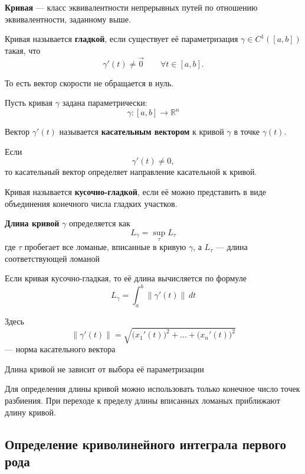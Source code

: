 \documentclass[12pt,a4paper]{article}
\begin{document}
\begin{definition}
\textbf{Кривая} — класс эквивалентности непрерывных путей по отношению эквивалентности, заданному выше.
\end{definition}

\begin{definition}
Кривая называется \textbf{гладкой}, если существует её параметризация
$\gamma \in C^1([a,b])$ такая, что
\[
\gamma'(t)\neq \vec{0}
\qquad \forall t\in[a,b].
\]

То есть вектор скорости не обращается в нуль.
\end{definition}

Пусть кривая $\gamma$ задана параметрически:
\[
\gamma:[a,b]\to\mathbb{R}^n
\]

\begin{definition}
Вектор $\gamma'(t)$ называется \textbf{касательным вектором} к кривой $\gamma$ в точке $\gamma(t)$.

Если
\[
\gamma'(t)\neq 0,
\]
то касательный вектор определяет направление касательной к кривой.
\end{definition}

\begin{definition}
Кривая называется \textbf{кусочно-гладкой}, если её можно представить в виде объединения конечного числа гладких участков.
\end{definition}

\begin{definition}
\textbf{Длина кривой} $\gamma$ определяется как
\[
L_\gamma=\sup_{\tau}L_\tau
\]
где $\tau$ пробегает все ломаные, вписанные в кривую $\gamma$, а $L_\tau$ — длина соответствующей ломаной


Если кривая кусочно-гладкая, то её длина вычисляется по формуле
\[
L_\gamma=\int_a^b\|\gamma'(t)\|\,dt
\]

Здесь
\[
\|\gamma'(t)\|
=
\sqrt{\bigl(x_1'(t)\bigr)^2+\dots+
\bigl(x_n'(t)\bigr)^2}
\]
— норма касательного вектора

Длина кривой не зависит от выбора её параметризации

\end{definition}

\begin{note}
Для определения длины кривой можно использовать только конечное число точек разбиения. При переходе к пределу длины вписанных ломаных приближают длину кривой.
\end{note}

\subsection{Определение криволинейного интеграла первого рода}
\end{document}
